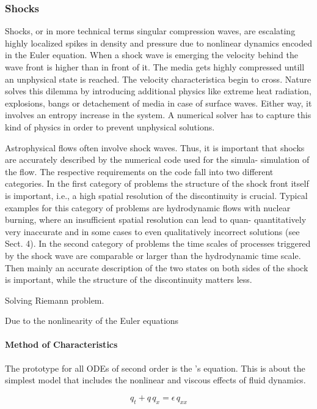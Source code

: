 \subsubsection{Shocks}
Shocks, or in more technical terms singular compression waves, are escalating
highly localized spikes in density and pressure due to nonlinear dynamics
encoded in the Euler equation. When a shock wave is emerging the velocity
behind the wave front is higher than in front of it. The media gets highly
compressed untill an unphysical state is reached. The velocity characteristica
begin to cross. Nature solves this dilemma by introducing additional physics
like extreme heat radiation, explosions, bangs or detachement of media in case
of surface waves. Either way, it involves an entropy increase in the system.
A numerical solver has to capture this kind of physics in order to prevent
unphysical solutions.

Astrophysical flows often involve shock waves. Thus, it is important that
shocks are accurately described by the numerical code used for the simula-
simulation of the flow. The respective requirements on the code fall into two different
categories. In the first category of problems the structure of the shock front
itself is important, i.e., a high spatial resolution of the discontinuity is crucial.
Typical examples for this category of problems are hydrodynamic flows with
nuclear burning, where an insufficient spatial resolution can lead to quan-
quantitatively very inaccurate and in some cases to even qualitatively incorrect
solutions (see Sect. 4). In the second category of problems the time scales
of processes triggered by the shock wave are comparable or larger than the
hydrodynamic time scale. Then mainly an accurate description of the two
states on both sides of the shock is important, while the structure of the
discontinuity matters less.


Solving Riemann problem.

Due to the nonlinearity of the Euler equations 

\paragraph{Method of Characteristics}

The prototype for all ODEs of second order is the 's equation.
This is about the simplest model that includes the nonlinear and viscous
effects of fluid dynamics.

\begin{equation}
\label{eq:charact-x-t}
    q_t + q \, q_x = \epsilon \, q_{xx}
\end{equation}

